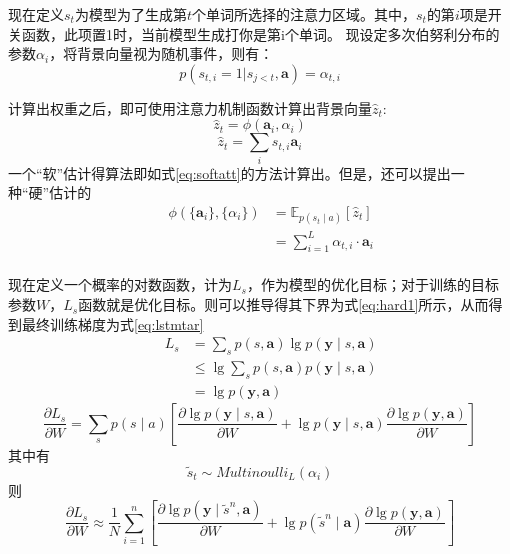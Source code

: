 现在定义$s_t$为模型为了生成第$t$个单词所选择的注意力区域。其中，$s_t$的第$i$项是开关函数，此项置1时，当前模型生成打你是第i个单词。
现设定多次伯努利分布的参数${\alpha_i}$，将背景向量视为随机事件，则有：
\begin{equation}
    p(s_{t,i} = 1|s_{j<t}, \textbf{a}) = \alpha_{t,i}
\end{equation}

计算出权重之后，即可使用注意力机制函数计算出背景向量$\hat{z}_t$:
\begin{equation}
    \label{eq:bgvector}
    \hat{z}_t=\phi(\textbf{a}_i,\alpha_i)
\end{equation}
\begin{equation}
    \hat{z}_t = \sum_i s_{t,i}\textbf{a}_i
\end{equation}
一个“软”估计得算法即如式\eqref{eq:softatt}的方法计算出。但是，还可以提出一种“硬”估计的
\begin{equation}
    \begin{aligned}
        &&\phi(\{\textbf{a}_i\},\{\alpha_i\})&= \mathbb{E}_{p(s_t\mid a)} [\hat{z}_t] \\
        && & =\sum_{i=1}^L \alpha_{t,i} \cdot \textbf{a}_i \\
    \end{aligned}
    \label{eq:softatt}
\end{equation}

现在定义一个概率的对数函数，计为$L_s$，作为模型的优化目标；对于训练的目标参数$W$，$L_s$函数就是优化目标。则可以推导得其下界为式\eqref{eq:hard1}所示，从而得到最终训练梯度为式\eqref{eq:lstmtar}
\begin{equation}
    \begin{aligned}
        && L_s &= \sum_s p(s, \textbf{a}) \lg p(\textbf{y}\mid {s }, \textbf{a} ) \\
        && & \le \lg \sum_sp(s, \textbf{a}) p(\textbf{y}\mid {s }, \textbf{a} ) \\
        && & = \lg p(\textbf{y}, \textbf{a})
    \end{aligned}
    \label{eq:hard1}
\end{equation}
\begin{equation}
    \frac{\partial L_s}{\partial W} = \sum_s p(s \mid a) [\frac{\partial \lg p(\textbf{y}\mid {s }, \textbf{a} )}{\partial W} + \lg p(\textbf{y}\mid {s }, \textbf{a} ) \frac{\partial \lg p(\textbf{y}, \textbf{a})}{\partial W} ]
    \label{eq:lstmtar}
\end{equation}
其中有
\begin{equation}
    \tilde{s}_t \sim Multinoulli_L({\alpha_i})
    \label{eq:stdistribute}
\end{equation}
则
\begin{equation}
    \frac{\partial L_s}{\partial W} \approx \frac{1}{N} \sum_{i=1}^{n} [\frac{\partial \lg p(\textbf{y}\mid \tilde{s}^n, \textbf{a} )}{\partial W} + \lg p(\tilde{s}^n \mid \textbf{a} ) \frac{\partial \lg p(\textbf{y}, \textbf{a})}{\partial W} ]
    \label{eq:lstmtar2}
\end{equation}

